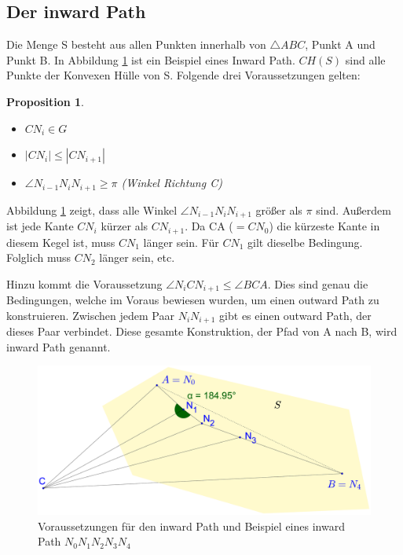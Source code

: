 \documentclass[a4paper,twoside]{IEEEtran}
\newtheorem{inwardPathProposition}{Proposition}
\begin{document}






\subsection{Der inward Path}
Die Menge S besteht aus allen Punkten innerhalb von $\triangle {ABC} $, Punkt A und Punkt B.
In Abbildung \ref{fig:inward_path_prop} ist ein Beispiel eines Inward Path.
$CH(S) $ sind alle Punkte der Konvexen Hülle von S. %
Folgende drei Voraussetzungen gelten:
\begin{inwardPathProposition}
\begin{itemize} %
	\item $CN_i \in G$
	\item $|CN_i| \leq |CN_{i+1}| $
	\item $\angle{N_{i-1}N_iN_{i+1}} \geq \pi $ (Winkel Richtung C)
\end{itemize} 
\end{inwardPathProposition}

Abbildung \ref{fig:inward_path_prop} zeigt, dass alle Winkel $\angle{N_{i-1}N_iN_{i+1}} $ größer als $\pi $ sind.
Außerdem ist jede Kante $CN_i $ kürzer als $CN_{i+1}$. 
Da CA ($= CN_0 $) die kürzeste Kante in diesem Kegel ist, muss $CN_1 $ länger sein. 
Für $CN_1 $ gilt dieselbe Bedingung. 
Folglich muss $CN_2 $ länger sein, etc.

Hinzu kommt die Voraussetzung $\angle{N_iCN_{i+1}} \leq \angle{BCA} $.
Dies sind genau die Bedingungen, welche im Voraus bewiesen wurden, um einen outward Path zu konstruieren. 
Zwischen jedem Paar $N_iN_{i+1} $ gibt es einen outward Path, der dieses Paar verbindet.
Diese gesamte Konstruktion, der Pfad von A nach B, wird inward Path genannt.

\begin{figure}[h!]
\centering
\includegraphics[width=1\linewidth]{inward_path_prop.eps}
\caption{Voraussetzungen für den inward Path und Beispiel eines inward Path $N_0N_1N_2N_3N_4 $}
\label{fig:inward_path_prop}
\end{figure}
\end{document}
